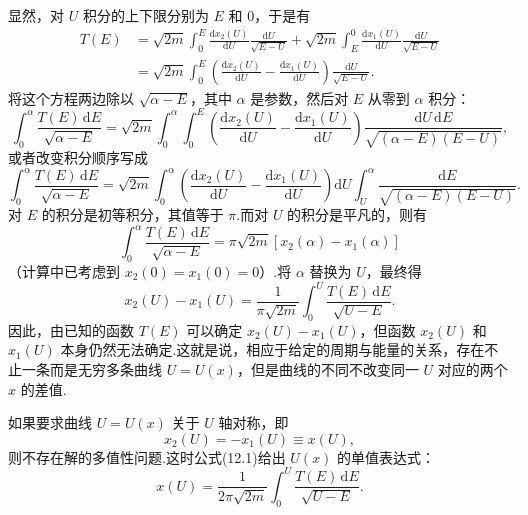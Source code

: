 显然，对 $U$ 积分的上下限分别为 $E$ 和 0，于是有
\begin{equation*}
\begin{aligned}
  T(E)&=\sqrt{2m}\int_0^E\frac{\mathrm{d}x_2(U)}{\mathrm{d}U}
  \frac{\mathrm{d}U}{\sqrt{E-U}}
  +\sqrt{2m}\int_E^0\frac{\mathrm{d}x_1(U)}{\mathrm{d}U}
  \frac{\mathrm{d}U}{\sqrt{E-U}}\\
  &=\sqrt{2m}\int_0^E\left(
  \frac{\mathrm{d}x_2(U)}{\mathrm{d}U}
  -\frac{\mathrm{d}x_1(U)}{\mathrm{d}U}\right)
  \frac{\mathrm{d}U}{\sqrt{E-U}}.
\end{aligned}
\end{equation*}
将这个方程两边除以 $\sqrt{\alpha-E}$，其中 $\alpha$ 是参数，然后对 $E$ 从零到 $\alpha$ 积分：
\begin{equation*}
  \int_0^{\alpha}\frac{T(E)\,\mathrm{d}E}{\sqrt{\alpha-E}}
  =\sqrt{2m}\int_0^{\alpha}\int_0^E\left(
  \frac{\mathrm{d}x_2(U)}{\mathrm{d}U}
  -\frac{\mathrm{d}x_1(U)}{\mathrm{d}U}\right)
  \frac{\mathrm{d}U\,\mathrm{d}E}
  {\sqrt{(\alpha-E)(E-U)}},
\end{equation*}
或者改变积分顺序写成
\begin{equation*}
  \int_0^{\alpha}\frac{T(E)\,\mathrm{d}E}{\sqrt{\alpha-E}}
  =\sqrt{2m}\int_0^{\alpha}\left(
  \frac{\mathrm{d}x_2(U)}{\mathrm{d}U}
  -\frac{\mathrm{d}x_1(U)}{\mathrm{d}U}\right)\mathrm{d}U
  \int_U^{\alpha}\frac{\mathrm{d}E}
  {\sqrt{(\alpha-E)(E-U)}}.
\end{equation*}
对 $E$ 的积分是初等积分，其值等于 $\pi$.而对 $U$ 的积分是平凡的，则有
\begin{equation*}
  \int_0^{\alpha}\frac{T(E)\,\mathrm{d}E}{\sqrt{\alpha-E}}
  =\pi\sqrt{2m}\left[x_2(\alpha)-x_1(\alpha)\right]
\end{equation*}
（计算中已考虑到 $x_2(0)=x_1(0)=0$）.将 $\alpha$ 替换为 $U$，最终得
\begin{equation}
  x_2(U)-x_1(U)=\frac{1}{\pi\sqrt{2m}}
  \int_0^U\frac{T(E)\,\mathrm{d}E}{\sqrt{U-E}}.
\end{equation}
因此，由已知的函数 $T(E)$ 可以确定 $x_2(U)-x_1(U)$，但函数 $x_2(U)$ 和 $x_1(U)$ 本身仍然无法确定.这就是说，相应于给定的周期与能量的关系，存在不止一条而是无穷多条曲线 $U=U(x)$，但是曲线的不同不改变同一 $U$ 对应的两个 $x$ 的差值.

如果要求曲线 $U=U(x)$ 关于 $U$ 轴对称，即
\begin{equation*}
  x_2(U)=-x_1(U)\equiv x(U),
\end{equation*}
则不存在解的多值性问题.这时公式(12.1)给出 $U(x)$ 的单值表达式：
\begin{equation}
  x(U)=\frac{1}{2\pi\sqrt{2m}}
  \int_0^U\frac{T(E)\,\mathrm{d}E}{\sqrt{U-E}}.
\end{equation}

